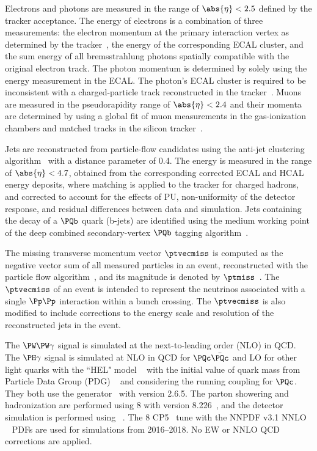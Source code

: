 Electrons and photons are measured in the range of $\abs{\eta} < 2.5$ defined by the tracker acceptance. The energy of electrons is a combination of three measurements: the electron momentum at the primary interaction vertex as determined by the tracker~\cite{pvdefinition}, the energy of the corresponding ECAL cluster, and the sum energy of all bremsstrahlung photons spatially compatible with the original electron track. The photon momentum is determined by solely using the energy measurement in the ECAL. The photon's ECAL cluster is required to be inconsistent with a charged-particle track reconstructed in the tracker~\cite{cmscollaboration2020electron}. Muons are measured in the pseudorapidity range of $\abs{\eta} < 2.4$ and their momenta are determined by using a global fit of muon measurements in the gas-ionization chambers and matched tracks in the silicon tracker~\cite{Sirunyan:2018}.


Jets are reconstructed from particle-flow candidates using the anti-\kt jet clustering algorithm~\cite{antikt} with a distance parameter of 0.4. The energy is measured in the range of $\abs{\eta}<4.7$, obtained from the corresponding corrected ECAL and HCAL energy deposits, where matching is applied to the tracker for charged hadrons, and corrected to account for the effects of PU, non-uniformity of the detector response, and residual differences between data and simulation. Jets containing the decay of a $\PQb$ quark (b-jets) are identified using the medium working point of the deep combined secondary-vertex $\PQb$ tagging algorithm~\cite{CMS:2017wtu}.


The missing transverse momentum vector $\ptvecmiss$ is computed as the negative vector \pt sum of all measured particles in an event, reconstructed with the particle flow algorithm~\cite{CMS-PRF-14-001}, and its magnitude is denoted by $\ptmiss$~\cite{Sirunyan_2019}. The $\ptvecmiss$ of an event is intended to represent the neutrinos associated with a single $\Pp \Pp$ interaction within a bunch crossing. The $\ptvecmiss$ is also modified to include corrections to the energy scale and resolution of the reconstructed jets in the event.

The $\PW\PW\gamma$ signal is simulated at the next-to-leading order (NLO) in QCD. The $\PH\gamma$ signal is simulated at NLO in QCD for $\PQc\bar{\PQc}$ and LO for other light quarks with the ``HEL" model ~\cite{alloul2014phenomenology} with the initial value of quark mass from Particle Data Group (PDG) ~\cite{quarkmass} and considering the running coupling for $\PQc$. They both use the \MGvATNLO generator~\cite{MGatNLO} with version 2.6.5. The parton showering and hadronization are performed using {\PYTHIA}8 with version 8.226~\cite{Sjostrand:2014zea}, and the detector simulation is performed using \GEANTfour~\cite{AGOSTINELLI2003250}. The {\PYTHIA}8 CP5~\cite{Sirunyan:2019dfx} tune with the NNPDF v3.1 NNLO ~\cite{collaboration2017parton} PDFs are used for simulations from 2016--2018. No EW or NNLO QCD corrections are applied.

